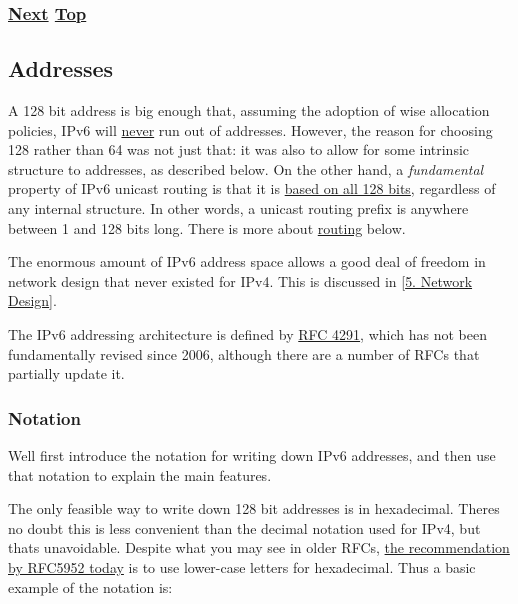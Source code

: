 \documentclass[
]{article}
\begin{document}
\subsubsection{\texorpdfstring{\hyperref[addresses]{Next}
\hyperref[ipv6-basic-technology]{Top}}{Next Top}}\label{next-top-1}

\pagebreak

\subsection{Addresses}\label{addresses}

A 128 bit address is big enough that, assuming the adoption of wise
allocation policies, IPv6 will \href{https://m.xkcd.com/865/}{never} run
out of addresses. However, the reason for choosing 128 rather than 64
was not just that: it was also to allow for some intrinsic structure to
addresses, as described below. On the other hand, a \emph{fundamental}
property of IPv6 unicast routing is that it is
\href{http://www.rfc-editor.org/info/bcp198}{based on all 128 bits},
regardless of any internal structure. In other words, a unicast routing
prefix is anywhere between 1 and 128 bits long. There is more about
\hyperref[routing]{routing} below.

The enormous amount of IPv6 address space allows a good deal of freedom
in network design that never existed for IPv4. This is discussed in
{[}\hyperref[network-design]{5. Network Design}{]}.

The IPv6 addressing architecture is defined by
\href{http://www.rfc-editor.org/info/rfc4291}{RFC 4291}, which has not
been fundamentally revised since 2006, although there are a number of
RFCs that partially update it.

\subsubsection{Notation}\label{notation}

We\textquotesingle ll first introduce the notation for writing down IPv6
addresses, and then use that notation to explain the main features.

The only feasible way to write down 128 bit addresses is in hexadecimal.
There\textquotesingle s no doubt this is less convenient than the
decimal notation used for IPv4, but that\textquotesingle s unavoidable.
Despite what you may see in older RFCs,
\href{https://www.rfc-editor.org/info/rfc5952}{the recommendation by
RFC5952 today} is to use lower-case letters for hexadecimal. Thus a
basic example of the notation is:
\end{document}
